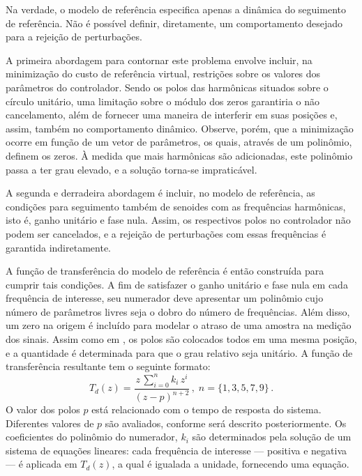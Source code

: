 \documentclass[repeatfields,oneside]{tcc}
\newcommand{\mycdot}{ \, }
\begin{document}
Na verdade, o modelo de referência especifica apenas a dinâmica do seguimento de referência.
Não é possível definir, diretamente, um comportamento desejado para a rejeição de perturbações.

A primeira abordagem para contornar este problema envolve incluir, na minimização do custo de referência virtual, restrições sobre os valores dos parâmetros do controlador.
Sendo os polos das harmônicas situados sobre o círculo unitário, uma limitação sobre o módulo dos zeros garantiria o não cancelamento, além de fornecer uma maneira de interferir em suas posições e, assim, também no comportamento dinâmico.
Observe, porém, que a minimização ocorre em função de um vetor de parâmetros, os quais, através de um polinômio, definem os zeros.
À medida que mais harmônicas são adicionadas, este polinômio passa a ter grau elevado, e a solução torna-se impraticável.

A segunda e derradeira abordagem é incluir, no modelo de referência, as condições para seguimento também de senoides com as frequências harmônicas, isto é, ganho unitário e fase nula.
Assim, os respectivos polos no controlador não podem ser cancelados, e a rejeição de perturbações com essas frequências é garantida indiretamente.

A função de transferência do modelo de referência é então construída para cumprir tais condições.
A fim de satisfazer o ganho unitário e fase nula em cada frequência de interesse, seu numerador deve apresentar um polinômio cujo número de parâmetros livres seja o dobro do número de frequências.
Além disso, um zero na origem é incluído para modelar o atraso de uma amostra na medição dos sinais.
Assim como em \textcite{Corleta2015, Bruna2020}, os polos são colocados todos em uma mesma posição, e a quantidade é determinada para que o grau relativo seja unitário.
A função de transferência resultante tem o seguinte formato:
\begin{equation} \label{eq:mr}
    T_d(z) = \dfrac{ z \mycdot \sum_{i = 0}^{n} k_i \mycdot z^i  }{ \left( z - p \right)^{n + 2} }
    \,,\;
    n = \{1, 3, 5, 7, 9\}
    \,.
\end{equation}
O valor dos polos $p$ está relacionado com o tempo de resposta do sistema.
Diferentes valores de $p$ são avaliados, conforme será descrito posteriormente.
Os coeficientes do polinômio do numerador, $k_i$ são determinados pela solução de um sistema de equações lineares:
cada frequência de interesse --- positiva e negativa --- é aplicada em $T_d(z)$, a qual é igualada a unidade, fornecendo uma equação.
\end{document}
